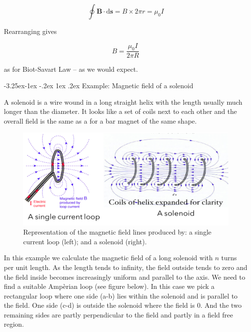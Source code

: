 \documentclass[
]{book}
\makeatletter
\renewcommand\subsection{%
\@startsection{subsection}{2}{\z@}%
              {-3.25ex\@plus -1ex \@minus -.2ex}%
              {1ex \@plus .2ex}%
              {\sffamily\bfseries}}
\numberwithin{equation}{section}
\makeatother
\begin{document}
\begin{equation}
\label{eq:ointB2}
\oint \mathbf{B} \cdot \mathrm{d}\mathbf{s} = B \times 2\pi r = \mu_0 I
\end{equation}

Rearranging gives

\begin{equation}
\label{eq:BiotSavart}
B = \frac{\mu_0 I}{2\pi R}
\end{equation}

as for Biot-Savart Law -- as we would expect.

\hypertarget{example-magnetic-field-of-a-solenoid}{%
\subsection{Example: Magnetic field of a solenoid}\label{example-magnetic-field-of-a-solenoid}}

A solenoid is a wire wound in a long straight helix with the length
usually much longer than the diameter. It looks like a set of coils next
to each other and the overall field is the same as a for a bar magnet of
the same shape.

\begin{figure}

{\centering \includegraphics[width=0.7\linewidth]{Figures/loopNsolenoid} 

}

\caption{Representation of the magnetic field lines produced by: a single current loop (left); and a solenoid (right).}\label{fig:loopNsolenoid}
\end{figure}

In this example we calculate the magnetic field of a long solenoid with
\(n\) turns per unit length. As the length tends to infinity, the field
outside tends to zero and the field inside becomes increasingly uniform
and parallel to the axis. We need to find a suitable Ampèrian loop (see figure below).
In this case we pick a rectangular loop where one side (a-b) lies within
the solenoid and is parallel to the field. One side (c-d) is outside the
solenoid where the field is 0. And the two remaining sides are partly
perpendicular to the field and partly in a field free region.
\end{document}
